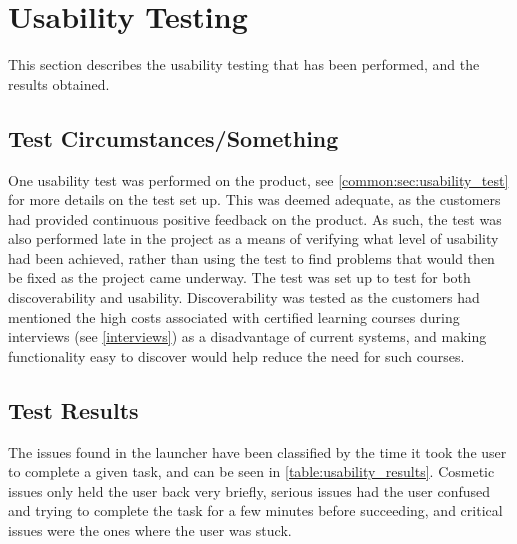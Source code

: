 \section{Usability Testing}
\label{sec:usability_test}
This section describes the usability testing that has been performed, and the results obtained. 

\subsection{Test Circumstances/Something}
One usability test was performed on the product, see \autoref{common:sec:usability_test} for more details on the test set up. 
This was deemed adequate, as the customers had provided continuous positive feedback on the product. 
As such, the test was also performed late in the project as a means of verifying what level of usability had been achieved, rather than using the test to find problems that would then be fixed as the project came underway. \newline
The test was set up to test for both discoverability and usability. 
Discoverability was tested as the customers had mentioned the high costs associated with certified learning courses during interviews (see \autoref{interviews}) as a disadvantage of current systems, and making functionality easy to discover would help reduce the need for such courses.

\subsection{Test Results}
The issues found in the launcher have been classified by the time it took the user to complete a given task, and can be seen in \autoref{table:usability_results}. 
Cosmetic issues only held the user back very briefly, serious issues had the user confused and trying to complete the task for a few minutes before succeeding, and critical issues were the ones where the user was stuck. 

